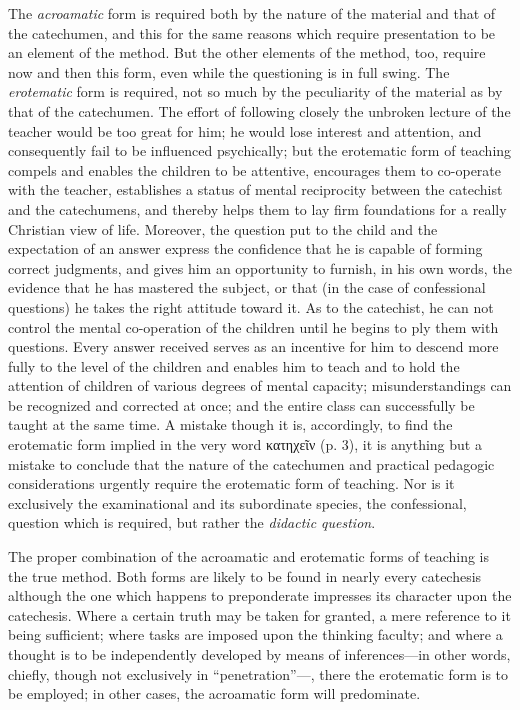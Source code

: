 The \emph{acroamatic} form is required both by the nature of the material and that of the catechumen, and this for the same
reasons which require presentation to be an element of the method. But the other elements of the method, too, require now and then this form, even while the questioning is in full swing. The \emph{erotematic} form is required, not so much by the peculiarity of the material as by that of the catechumen. The effort of following closely the unbroken lecture of the teacher would be too great for him; he would lose interest and attention, and consequently fail to be influenced psychically; but the erotematic form of teaching compels and enables the children to be attentive, encourages them to co-operate with the teacher, establishes a status of mental reciprocity between the catechist and the catechumens, and thereby helps them to lay firm foundations for a really Christian view of life. Moreover, the question put to the child and the expectation of an answer express the confidence that he is capable of forming correct judgments, and gives him an opportunity to furnish, in his own words, the evidence that he has mastered the subject, or that (in the case of confessional questions) he takes the right attitude toward it. As to the catechist, he can not control the mental co-operation of the children until he begins to ply them with questions. Every answer received serves as an incentive for him to descend more fully to the level of the children and enables him to teach and to hold the attention of children of various degrees of mental capacity; misunderstandings can be recognized and corrected at once; and the entire class can successfully be taught at the same time. A mistake though it is, accordingly, to find the erotematic form implied in the very word κατηχεῖν (p. 3), it is anything but a mistake to conclude that the nature of the catechumen and practical pedagogic considerations urgently require the erotematic form of teaching. Nor is it exclusively the examinational and its subordinate species, the confessional, question which is required, but rather the \emph{didactic question}.

The proper combination of the acroamatic and erotematic forms of teaching is the true method. Both forms are likely to be found in nearly every catechesis although the one which happens to preponderate impresses its character upon the catechesis. Where a certain truth may be taken for granted, a mere reference to it being sufficient; where tasks are imposed upon the thinking faculty; and where a thought is to be independently developed by means of inferences—in other words, chiefly, though not exclusively in “penetration”—, there the erotematic form is to be employed; in other cases, the acroamatic form will predominate.

